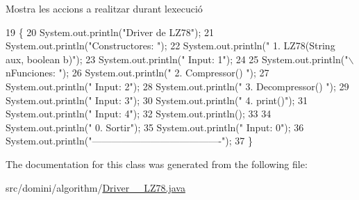 Mostra les accions a realitzar durant l\textquotesingle{}execució 


\begin{DoxyCode}
19                                      \{
20         System.out.println(\textcolor{stringliteral}{"Driver de LZ78"});
21         System.out.println(\textcolor{stringliteral}{"Constructores: "});
22         System.out.println(\textcolor{stringliteral}{"     1. LZ78(String aux, boolean b)"});
23         System.out.println(\textcolor{stringliteral}{"     Input: 1"});
24 
25         System.out.println(\textcolor{stringliteral}{"\(\backslash\)nFunciones: "});
26         System.out.println(\textcolor{stringliteral}{"     2. Compressor() "});
27         System.out.println(\textcolor{stringliteral}{"     Input: 2"});
28         System.out.println(\textcolor{stringliteral}{"     3. Decompressor() "});
29         System.out.println(\textcolor{stringliteral}{"     Input: 3"});
30         System.out.println(\textcolor{stringliteral}{"     4. print()"});
31         System.out.println(\textcolor{stringliteral}{"     Input: 4"});
32         System.out.println();
33 
34         System.out.println(\textcolor{stringliteral}{"     0. Sortir"});
35         System.out.println(\textcolor{stringliteral}{"     Input: 0"});
36         System.out.println(\textcolor{stringliteral}{"----------------------------------------"});
37     \}
\end{DoxyCode}


The documentation for this class was generated from the following file\+:\begin{DoxyCompactItemize}
\item 
src/domini/algorithm/\hyperlink{Driver____LZ78_8java}{Driver\+\_\+\+\_\+\+L\+Z78.\+java}\end{DoxyCompactItemize}
